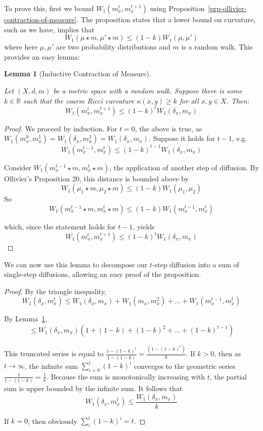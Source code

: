 \documentclass[
  letterpaper,
  DIV=11,
  numbers=noendperiod]{scrartcl}
\theoremstyle{plain}
\theoremstyle{definition}
\theoremstyle{plain}
\newtheorem{lemma}{Lemma}[section]
\theoremstyle{definition}
\theoremstyle{plain}
\theoremstyle{remark}
\begin{document}
To prove this, first we bound \(W_{1}(m_{x}^t,m_{x}^{t+1})\) using
Proposition~\ref{prp-ollivier-contraction-of-measure}. The proposition
states that a lower bound on curvature, such as we have, implies that \[
W_{1}(\mu \star m, \mu' \star m) \leq (1-k)W_{1}(\mu, \mu')
\] where here \(\mu,\mu'\) are two probability distributions and \(m\)
is a random walk. This provides an easy lemma:

\begin{lemma}[Inductive Contraction of
Measure]\protect\hypertarget{lem-inductive-contraction-of-measure}{}\label{lem-inductive-contraction-of-measure}

Let \((X,d,m)\) be a metric space with a random walk. Suppose there is
some \(k \in \mathbb{R}\) such that the coarse Ricci curvature
\(\kappa(x,y) \geq k\) for all \(x,y \in X\). Then: \[
W_1\left(m_x^t, m_x^{t+1}\right) \leq(1-k)^t W_1\left(\delta_x,m_x\right)
\]

\end{lemma}

\begin{proof}
We proceed by induction. For \(t=0\), the above is true, as
\(W_{1}(m_{x}^0, m_{x}^{1}) =W_{1}(\delta_x, m_{x}^{1}) = W_1\left(\delta_x,m_x\right)\).
Suppose it holds for \(t-1\), e.g. \[
W_1\left(m_x^{t-1}, m_x^{t}\right) \leq(1-k)^{t-1} W_1\left(\delta_x,m_x\right)
\]

Consider \(W_1\left(m_x^{t-1}\star m, m_x^{t}\star m\right)\), the
application of another step of diffusion. By Ollivier's Proposition 20,
this distance is bounded above by \[
W_1\left(\mu_1 \star m, \mu_2 \star m\right) \leq(1-k) W_1\left(\mu_1, \mu_2\right)
\] So \[
W_1\left(m_x^{t-1}\star m, m_x^{t}\star m\right) \leq  (1-k)W_1\left(m_x^{t-1}, m_x^{t}\right)
\]

which, since the statement holds for \(t-1\), yields \[
W_1\left(m_x^t, m_x^{t+1}\right) \leq(1-k)^t W_1\left(\delta_x,m_x\right)
\]
\end{proof}

We can now use this lemma to decompose our \(t\)-step diffusion into a
sum of single-step diffusions, allowing an easy proof of the
proposition.

\begin{proof}
By the triangle inequality, \[
W_{1}(\delta_{x},m_{x}^t) \leq W_1\left(\delta_x,m_x\right) + W_{1}(m_{x},m_{x}^2) + \dots + W_{1}(m_{x}^{t-1}, m_{x}^t)
\]

By Lemma~\ref{lem-inductive-contraction-of-measure}, \[
\leq W_1\left(\delta_x,m_x\right)\left(1+(1-k)+(1-k)^2+\ldots+(1-k)^{t-1}\right)
\]

This truncated series is equal to
\(\frac{1-(1-k)^t}{1-(1-k)} = \frac{(1-(1-k)^t)}{k}\). If \(k>0\), then
as \(t \to \infty\), the infinite sum \(\sum_{i=0}^t (1-k)^i\) converges
to the geometric series \(\frac{1}{1-(1-k)} = \frac{1}{k}\). Because the
sum is monotonically increasing with \(t\), the partial sum is upper
bounded by the infinite sum. It follows that \[
W_{1}(\delta_{x},m_{x}^t) \leq \frac{W_1\left(\delta_x,m_x\right)}{k}
\]

If \(k=0\), then obviously \(\sum_{i}^t (1-k)^i = t\).
\end{proof}
\end{document}
